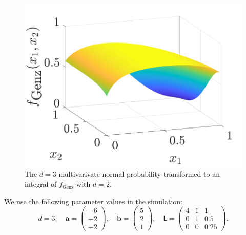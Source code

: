 \documentclass{iitthesis}          %
\newcommand{\bm}[1]{\boldsymbol{#1}}
\newcommand{\va}{\bm{a}}
\newcommand{\vb}{\bm{b}}
\newcommand{\mL}{\mathsf{L}}
\begin{document}
\begin{figure}
	\centering
		\includegraphics[width=0.9\linewidth]{GenzFunc_varTx_none}
	\caption{The $d=3$ multivarivate normal probability transformed to an integral of $f_{\text{Genz}}$ with  $d=2$.}
	\label{fig:MVN_Genz}
\end{figure}

We use the following parameter values in the simulation: 
\begin{equation*}
d = 3, \quad \va = \begin{pmatrix}
-6 \\ -2 \\ -2
\end{pmatrix}, \quad 
\vb = \begin{pmatrix}
5 \\ 2 \\ 1
\end{pmatrix} , \quad 
\mL = \begin{pmatrix}
4 & 1 & 1 \\ 0 & 1 & 0.5 \\ 0 & 0 & 0.25
\end{pmatrix}.
\end{equation*}
\end{document}
